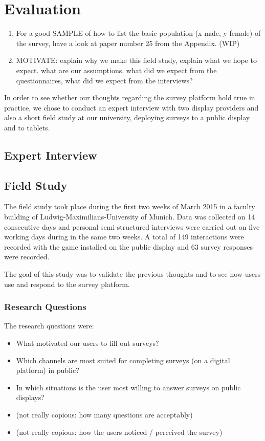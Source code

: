 \section{Evaluation}

	\begin{enumerate}
	\item For a good SAMPLE of how to list the basic population (x male, y female) of the survey, have a look at paper number 25 from the Appendix. (WIP)
	\item MOTIVATE: explain why we make this field study, explain what we hope to expect. what are our assumptions. what did we expect from the questionnaires, what did we expect from the interviews?
	\end{enumerate}

	In order to see whether our thoughts regarding the survey platform hold true in practice, we chose to conduct an expert interview with two display providers and also a short field study at our university, deploying surveys to a public display and to tablets.


\subsection{Expert Interview}



\subsection{Field Study}

	The field study took place during the first two weeks of March 2015 in a faculty building of Ludwig-Maximilians-University of Munich. Data was collected on 14 consecutive days and personal semi-structured interviews were carried out on five working days during in the same two weeks. A total of 149 interactions were recorded with the game installed on the public display and 63 survey responses were recorded.

	The goal of this study was to validate the previous thoughts and to see how users use and respond to the survey platform.

\subsubsection{Research Questions}

	The research questions were:

	\begin{itemize}
	\item What motivated our users to fill out surveys?
	\item Which channels are most suited for completing surveys (on a digital platform) in public?
	\item In which situations is the user most willing to answer surveys on public displays?
	\item (not really copious: how many questions are acceptably)
	\item (not really copious: how the users noticed / perceived the survey)
	\end{itemize}

